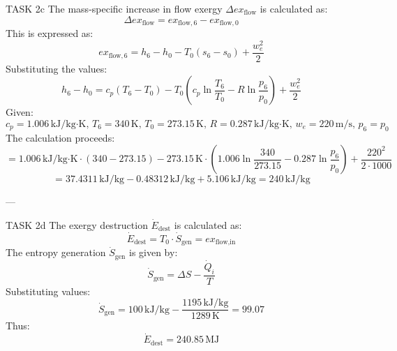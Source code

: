 TASK 2c  
The mass-specific increase in flow exergy \( \Delta ex_{\text{flow}} \) is calculated as:  
\[
\Delta ex_{\text{flow}} = ex_{\text{flow},6} - ex_{\text{flow},0}
\]  
This is expressed as:  
\[
ex_{\text{flow},6} = h_6 - h_0 - T_0 (s_6 - s_0) + \frac{w_e^2}{2}
\]  
Substituting the values:  
\[
h_6 - h_0 = c_p (T_6 - T_0) - T_0 \left( c_p \ln \frac{T_6}{T_0} - R \ln \frac{p_6}{p_0} \right) + \frac{w_e^2}{2}
\]  
Given:  
\[
c_p = 1.006 \, \text{kJ/kg·K}, \, T_6 = 340 \, \text{K}, \, T_0 = 273.15 \, \text{K}, \, R = 0.287 \, \text{kJ/kg·K}, \, w_e = 220 \, \text{m/s}, \, p_6 = p_0
\]  
The calculation proceeds:  
\[
= 1.006 \, \text{kJ/kg·K} \cdot (340 - 273.15) - 273.15 \, \text{K} \cdot \left( 1.006 \ln \frac{340}{273.15} - 0.287 \ln \frac{p_6}{p_0} \right) + \frac{220^2}{2 \cdot 1000}
\]  
\[
= 37.4311 \, \text{kJ/kg} - 0.48312 \, \text{kJ/kg} + 5.106 \, \text{kJ/kg} = 240 \, \text{kJ/kg}
\]  

---

TASK 2d  
The exergy destruction \( \dot{E}_{\text{dest}} \) is calculated as:  
\[
\dot{E}_{\text{dest}} = T_0 \cdot \dot{S}_{\text{gen}} = ex_{\text{flow,in}}
\]  
The entropy generation \( \dot{S}_{\text{gen}} \) is given by:  
\[
\dot{S}_{\text{gen}} = \Delta S - \frac{\dot{Q}_i}{T}
\]  
Substituting values:  
\[
\dot{S}_{\text{gen}} = 100 \, \text{kJ/kg} - \frac{1195 \, \text{kJ/kg}}{1289 \, \text{K}} = 99.07
\]  
Thus:  
\[
\dot{E}_{\text{dest}} = 240.85 \, \text{MJ}
\]